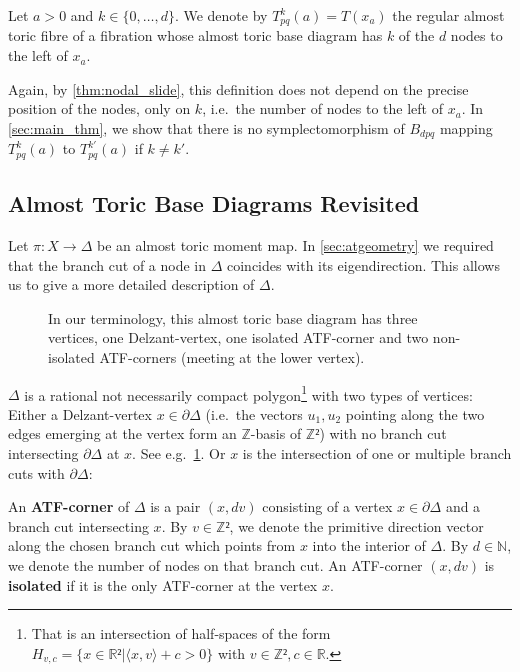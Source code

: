 \documentclass[12pt,a4paper,draft]{scrartcl}
\begin{document}
\begin{definition}
  \label{def:our_tori}
    Let $a>0$ and $k \in \{0,\ldots,d\}$.
We denote by $T^k_{pq}(a) = T(x_a)$ the regular almost toric fibre of a fibration whose almost toric base diagram has $k$ of the $d$ nodes to the left of $x_a$. 
\end{definition}

Again, by \cref{thm:nodal_slide}, this definition does not depend on the precise position of the nodes, only on $k$, i.e.\ the number of nodes to the left of $x_a$.
In \cref{sec:main_thm}, we show that there is no symplectomorphism of $B_{dpq}$ mapping $T^k_{pq}(a)$ to $T^{k'}_{pq}(a)$ if $k \neq k'$.


\subsection{Almost Toric Base Diagrams Revisited}
\label{sec:atf_base_diagrams}

Let $π:X → Δ$ be an almost toric moment map. In \cref{sec:atgeometry} we required that the branch cut of a node in $Δ$ coincides with its eigendirection.
This allows us to give a more detailed description of $Δ$.

\begin{figure}
  \centering
  \caption{In our terminology, this almost toric base diagram has three vertices, one Delzant-vertex, one isolated ATF-corner and two non-isolated ATF-corners (meeting at the lower vertex).}
  \label{fig:atf_example2}
\end{figure}

$Δ$ is a rational not necessarily compact polygon\footnote{That is an intersection of half-spaces of the form $H_{v,c} = \{x ∈ ℝ² | ⟨x,v⟩+c > 0\}$ with $v ∈ ℤ², c ∈ ℝ$.} with two types of vertices: Either a Delzant-vertex $x ∈ ∂Δ$ (i.e.\ the vectors $u_1,u_2$ pointing along the two edges emerging at the vertex form an $ℤ$-basis of $ℤ²$) with no branch cut intersecting $∂Δ$ at $x$. See e.g.\ \cref{fig:atf_example2}.
Or $x$ is the intersection of one or multiple branch cuts with $∂Δ$:

\begin{definition}
  \label{def:atf_corner}
  An \textbf{ATF-corner} of $Δ$ is a pair $(x,dv)$ consisting of a vertex $x ∈ ∂Δ$ and a branch cut intersecting $x$.
  By $v ∈ ℤ²$, we denote the primitive direction vector along the chosen branch cut which points from $x$ into the interior of $\Delta$.
  By $d \in \mathbb{N}$, we denote the number of nodes on that branch cut.
An ATF-corner $(x,dv)$ is \textbf{isolated} if it is the only ATF-corner at the vertex $x$. 
\end{definition}
\end{document}
